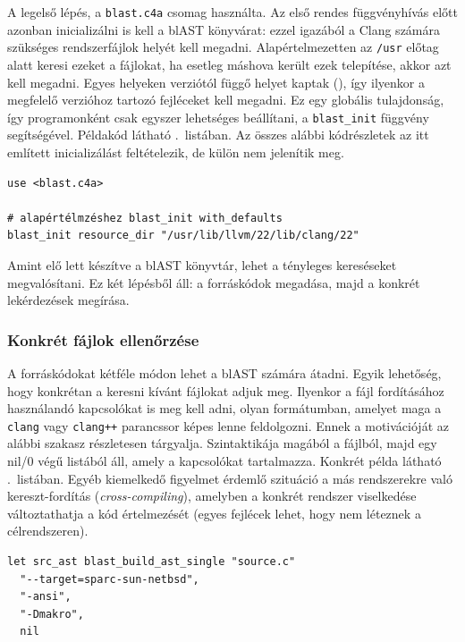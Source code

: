 A legelső lépés, a {\tt blast.c4a} csomag használta.
Az első rendes függvényhívás előtt azonban inicializálni is kell a blAST könyvárat: ezzel igazából a Clang számára szükséges rendszerfájlok helyét kell megadni.
Alapértelmezetten az {\tt /usr} előtag alatt keresi ezeket a fájlokat, ha esetleg máshova került ezek telepítése, akkor azt kell megadni.
Egyes helyeken verziótól függő helyet kaptak (), így ilyenkor a megfelelő verzióhoz tartozó fejléceket kell megadni.
Ez egy globális tulajdonság, így programonként csak egyszer lehetséges beállítani, a {\tt blast\_init} függvény segítségével.
Példakód látható .~listában.
Az összes alábbi kódrészletek az itt említett inicializálást feltételezik, de külön nem jelenítik meg.

\begin{lstlisting}[caption={A blAST könyvár inicializálása},label=lst:blast-init]
use <blast.c4a>

# alapértélmzéshez blast_init with_defaults
blast_init resource_dir "/usr/lib/llvm/22/lib/clang/22"
\end{lstlisting}

Amint elő lett készítve a blAST könyvtár, lehet a tényleges kereséseket megvalósítani.
Ez két lépésből áll: a forráskódok megadása, majd a konkrét lekérdezések megírása.

\subsubsection*{Konkrét fájlok ellenőrzése}

A forráskódokat kétféle módon lehet a blAST számára átadni.
Egyik lehetőség, hogy konkrétan a keresni kívánt fájlokat adjuk meg.
Ilyenkor a fájl fordításához használandó kapcsolókat is meg kell adni, olyan formátumban, amelyet maga a {\tt clang} vagy {\tt clang++} parancssor képes lenne feldolgozni.
Ennek a motivációját az alábbi szakasz részletesen tárgyalja.
Szintaktikája magából a fájlból, majd egy \cfn nil/0 végű listából áll, amely a kapcsolókat tartalmazza.
Konkrét példa látható .~listában.
Egyéb kiemelkedő figyelmet érdemlő szituáció a más rendszerekre való kereszt-fordítás ({\it cross-compiling}), amelyben a konkrét rendszer viselkedése változtathatja a kód értelmezését (\pl egyes fejlécek lehet, hogy nem léteznek a célrendszeren).

\begin{lstlisting}[caption={Egyszeri források megadása},label=lst:blast-single]
let src_ast blast_build_ast_single "source.c"
  "--target=sparc-sun-netbsd",
  "-ansi",
  "-Dmakro",
  nil
\end{lstlisting}

